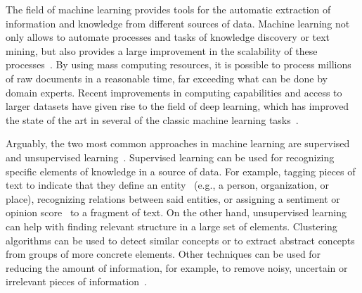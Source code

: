     The field of machine learning provides tools for the automatic extraction of information and knowledge from different
    sources of data. 
    Machine learning not only allows to automate processes and tasks of knowledge discovery or text mining, but also provides a large
    improvement in the scalability of these processes~\cite{wu2014data}. By using mass computing resources, it is possible to process millions
    of raw documents in a reasonable time, far exceeding what can be done by domain experts.
    Recent improvements in computing capabilities and access to larger datasets have given rise
    to the field of deep learning, which has improved the state of the art in
    several of the classic machine learning tasks~\cite{lecun2015deep}.

	Arguably, the two most common approaches in machine learning are supervised and unsupervised learning~\cite{kevin2012machine}.
    Supervised learning can be used for recognizing specific elements of knowledge in a source of data. For example, tagging
    pieces of text to indicate that they define an entity~\cite{nadeau2007survey} (e.g., a person, organization, or place), recognizing relations between
    said entities, or assigning a sentiment or opinion score~\cite{liu2012sentiment} to a fragment of text. On the other hand, unsupervised learning
    can help with finding relevant structure in a large set of elements. Clustering algorithms can be used to detect similar
    concepts or to extract abstract concepts from groups of more concrete elements. Other techniques can be used for reducing
    the amount of information, for example, to remove noisy, uncertain or irrelevant pieces of
    information~\cite{bingham2001random}.

